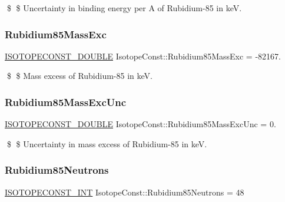 \$ \$ Uncertainty in binding energy per A of Rubidium-\/85 in keV. \mbox{\label{group___isotope_const-_rubidium-_rb85_ga67a01dd49caedecff816ae7b57601568}} 
\subsubsection{\texorpdfstring{Rubidium85\+Mass\+Exc}{Rubidium85MassExc}}
{\footnotesize\ttfamily \mbox{\hyperlink{group___isotope_const-_macros_ga8f45a7272ce02c0b4c65c44636ed719a}{I\+S\+O\+T\+O\+P\+E\+C\+O\+N\+S\+T\+\_\+\+D\+O\+U\+B\+LE}} Isotope\+Const\+::\+Rubidium85\+Mass\+Exc = -\/82167.}

\$ \$ Mass excess of Rubidium-\/85 in keV. \mbox{\label{group___isotope_const-_rubidium-_rb85_gadcb0613d1b5da374f15b3e35b2056720}} 
\subsubsection{\texorpdfstring{Rubidium85\+Mass\+Exc\+Unc}{Rubidium85MassExcUnc}}
{\footnotesize\ttfamily \mbox{\hyperlink{group___isotope_const-_macros_ga8f45a7272ce02c0b4c65c44636ed719a}{I\+S\+O\+T\+O\+P\+E\+C\+O\+N\+S\+T\+\_\+\+D\+O\+U\+B\+LE}} Isotope\+Const\+::\+Rubidium85\+Mass\+Exc\+Unc = 0.}

\$ \$ Uncertainty in mass excess of Rubidium-\/85 in keV. \mbox{\label{group___isotope_const-_rubidium-_rb85_ga424b3742966772689ddf0d27aa4d0a03}} 
\subsubsection{\texorpdfstring{Rubidium85\+Neutrons}{Rubidium85Neutrons}}
{\footnotesize\ttfamily \mbox{\hyperlink{group___isotope_const-_macros_ga5f18360b3e99483a35c32d789e62621c}{I\+S\+O\+T\+O\+P\+E\+C\+O\+N\+S\+T\+\_\+\+I\+NT}} Isotope\+Const\+::\+Rubidium85\+Neutrons = 48}

